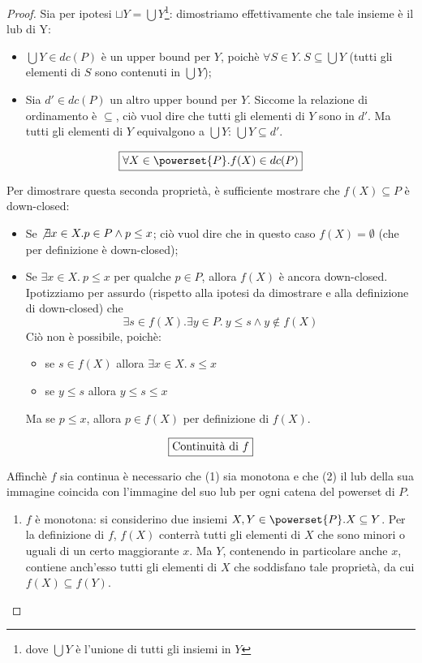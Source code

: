 \begin{proof}
Sia per ipotesi $\sqcup Y = \bigcup Y$\footnote{dove $\bigcup Y$ è l'unione di
tutti gli insiemi in $Y$}: dimostriamo effettivamente che tale insieme è il lub
di Y:
\begin{itemize}
  \item $\bigcup Y \in dc(P)$ è un upper bound per $Y$, poichè
    $\forall{S}\in Y.\ S \subseteq \bigcup Y$ (tutti gli elementi di $S$ sono
    contenuti in $\bigcup Y$);
  \item Sia $d'\in dc(P)$ un altro upper bound per $Y$. Siccome la relazione di
    ordinamento è $\subseteq$, ciò vuol dire che tutti gli elementi di $Y$ sono
    in $d'$. Ma tutti gli elementi di $Y$ equivalgono a $\bigcup Y$:
    $\bigcup Y \subseteq d'$.
\end{itemize}

$$
\boxer{\forall{X} \in \powerset{P}. f(X) \in dc(P)}
$$

Per dimostrare questa seconda proprietà, è sufficiente mostrare che
$f(X) \subseteq P$ è down-closed:

\begin{itemize}
  \item Se $\not \exists{x}\in X. p\in P \land p \leq x$; ciò vuol dire che in
    questo caso $f(X) = \emptyset$ (che per definizione è down-closed);
  \item Se $\exists{x}\in X.\ p \leq x$ per qualche $p \in P$, allora $f(X)$ è
    ancora down-closed. Ipotizziamo per assurdo (rispetto alla ipotesi da
    dimostrare e alla definizione di down-closed) che
    $$
    \exists{s\in f(X)}.\exists{y}\in P.\ y \leq s \land y \not \in f(X)
    $$
    Ciò non è possibile, poichè:
    \begin{itemize}
      \item se $s \in f(X)$ allora $\exists{x}\in X.\ s \leq x$
      \item se $y \leq s$ allora $y \leq s \leq x$
    \end{itemize}
    Ma se $p \leq x$, allora $p \in f(X)$ per definizione di $f(X)$.
\end{itemize}

$$
\boxed{\text{Continuità di } f}
$$

Affinchè $f$ sia continua è necessario che (1) sia monotona e che (2) il lub
della sua immagine coincida con l'immagine del suo lub per ogni catena del
powerset di $P$.

\begin{enumerate}
  \item $f$ è monotona: si considerino due insiemi
    $X,Y\in \powerset{P}. X \subseteq Y$. Per la definizione di $f$, $f(X)$ conterrà
    tutti gli elementi di $X$ che sono minori o uguali di un certo maggiorante
    $x$.
    Ma $Y$, contenendo in particolare anche $x$, contiene anch'esso tutti gli
    elementi di $X$ che soddisfano tale proprietà, da cui
    $f(X) \subseteq f(Y)$.


\end{enumerate}
\end{proof}

